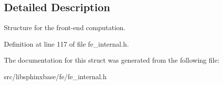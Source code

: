 \subsection{Detailed Description}
Structure for the front-\/end computation. 



Definition at line 117 of file fe\-\_\-internal.\-h.



The documentation for this struct was generated from the following file\-:\begin{DoxyCompactItemize}
\item 
src/libsphinxbase/fe/fe\-\_\-internal.\-h\end{DoxyCompactItemize}
